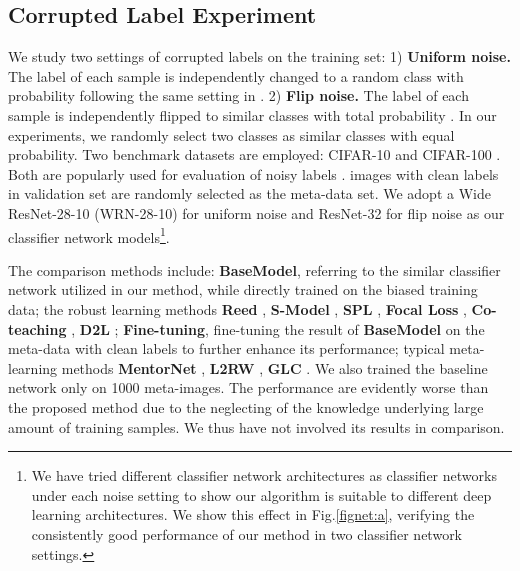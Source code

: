 \documentclass{article}
\begin{document}
	\subsection{Corrupted Label Experiment}\label{noise}\vspace{0mm}
	We study two settings of corrupted labels on the training set: 1) \textbf{Uniform noise.} The label of each sample is independently changed to a random class with probability  following the same setting in \cite{zhang2016understanding}.
	2) \textbf{Flip noise.} The label of each sample is independently flipped to similar classes with total probability . In our experiments, we randomly select two classes as similar classes with equal probability.
	Two benchmark datasets are employed: CIFAR-10 and CIFAR-100 \cite{krizhevsky2009learning}. Both are popularly used for evaluation of noisy labels \cite{ma2018dimensionality,han2018co}. images with clean labels in validation set are randomly selected as the meta-data set.
We adopt a Wide ResNet-28-10 (WRN-28-10) \cite{zagoruyko2016wide} for uniform noise and ResNet-32 \cite{he2016deep} for flip noise as our classifier network models\footnote{We have tried different classifier network architectures as classifier networks under each noise setting to show our
		algorithm is suitable to different deep learning architectures. We show this effect in Fig.\ref{fignet:a}, verifying the consistently good performance of our method in two classifier network settings.}.
	
	
	The comparison methods include: \textbf{BaseModel}, referring to the similar classifier network utilized in our method, while directly trained on the biased training data; the robust learning methods \textbf{Reed} \cite{reed2014training}, \textbf{S-Model} \cite{goldberger2016training} , \textbf{SPL} \cite{kumar2010self}, \textbf{Focal Loss} \cite{lin2018focal}, \textbf{Co-teaching} \cite{han2018co}, \textbf{D2L} \cite{ma2018dimensionality}; \textbf{Fine-tuning}, fine-tuning the result of \textbf{BaseModel} on the meta-data with clean labels to further enhance its performance; typical meta-learning methods \textbf{MentorNet} \cite{jiang2018mentornet}, \textbf{L2RW} \cite{ren2018learning}, \textbf{GLC} \cite{hendrycks2018using}.
	We also trained the baseline network only on 1000 meta-images. The performance are evidently worse than the proposed method due to the neglecting of the knowledge underlying large amount of training samples. We thus have not involved its results in comparison.
	
\end{document}
